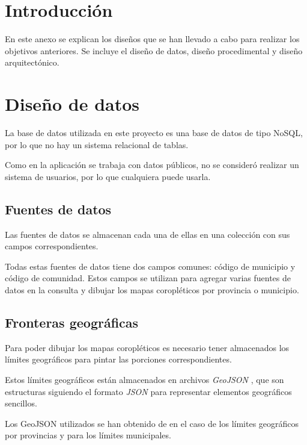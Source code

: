 
\section{Introducción}

En este anexo se explican los diseños que se han llevado a cabo para realizar los objetivos anteriores. Se incluye el diseño de datos, diseño procedimental y diseño arquitectónico.

\section{Diseño de datos}

La base de datos utilizada en este proyecto es una base de datos de tipo NoSQL, por lo que no hay un sistema relacional de tablas.

Como en la aplicación se trabaja con datos públicos, no se consideró realizar un sistema de usuarios, por lo que cualquiera puede usarla.

\subsection{Fuentes de datos}

Las fuentes de datos se almacenan cada una de ellas en una colección con sus campos correspondientes.

Todas estas fuentes de datos tiene dos campos comunes: código de municipio y código de comunidad. Estos campos se utilizan para agregar varias fuentes de datos en la consulta y dibujar los mapas coropléticos por provincia o municipio.

\subsection{Fronteras geográficas}

Para poder dibujar los mapas coropléticos es necesario tener almacenados los límites geográficos para pintar las porciones correspondientes.

Estos límites geográficos están almacenados en archivos \textit{GeoJSON} \cite{misc:geojson}, que son estructuras siguiendo el formato \textit{JSON} para representar elementos geográficos sencillos.

Los GeoJSON utilizados se han obtenido de \cite{misc:limitesmunicipales} en el caso de los límites geográficos por provincias y \cite{misc:carto} para los límites municipales.

